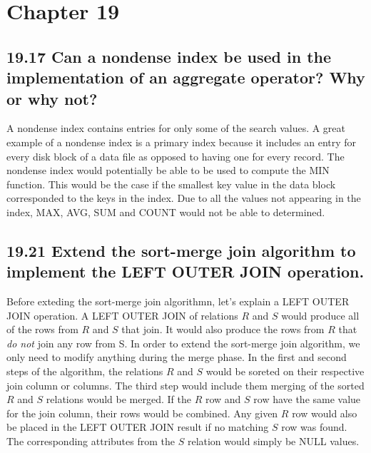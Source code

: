 \section*{Chapter 19}


\subsection*{19.17 Can a nondense index be used in the implementation of an aggregate operator? Why or why not?}
A nondense index contains entries for only some of the search values. A great example of a nondense index is a primary index because it includes an entry for every disk block of a data file as opposed to having one for every record. The nondense index would potentially be able to be used to compute the MIN function. This would be the case if the smallest key value in the data block corresponded to the keys in the index. Due to all the values not appearing in the index, MAX, AVG, SUM and COUNT would not be able to determined.

\subsection*{19.21 Extend the sort-merge join algorithm to implement the LEFT OUTER JOIN operation.}
Before exteding the sort-merge join algorithmn, let's explain a LEFT OUTER JOIN operation. A LEFT OUTER JOIN of relations $R$ and $S$ would produce all of the rows from $R$ and $S$ that join. It would also produce the rows from $R$ that \textit{do not} join any row from S. In order to extend the sort-merge join algorithm, we only need to modify anything during the merge phase. In the first and second steps of the algorithm, the relations $R$ and $S$ would be soreted on their respective join column or columns. The third step would include them merging of the sorted $R$ and $S$ relations would be merged. If the $R$ row and $S$ row have the same value for the join column, their rows would be combined. Any given $R$ row would also be placed in the LEFT OUTER JOIN result if no matching $S$ row was found. The corresponding attributes from the $S$ relation would simply be NULL values.